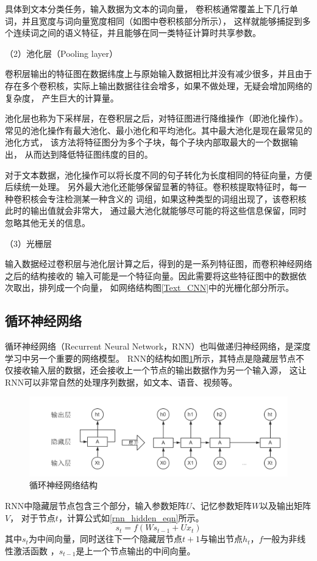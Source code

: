 具体到文本分类任务，输入数据为文本的词向量，
卷积核通常覆盖上下几行单词，并且宽度与词向量宽度相同（如图中卷积核部分所示），
这样就能够捕捉到多个连续词之间的语义特征，并且能够在同一类特征计算时共享参数。

（2）池化层（Pooling layer）

卷积层输出的特征图在数据纬度上与原始输入数据相比并没有减少很多，并且由于
存在多个卷积核，实际上输出数据往往会增多，如果不做处理，无疑会增加网络的复杂度，
产生巨大的计算量。

池化层也称为下采样层，在卷积层之后，对特征图进行降维操作（即池化操作）。
常见的池化操作有最大池化、最小池化和平均池化。其中最大池化是现在最常见的池化方式，
该方法将特征图分为多个子块，每个子块内部取最大的一个数据输出，
从而达到降低特征图纬度的目的。

对于文本数据，池化操作可以将长度不同的句子转化为长度相同的特征向量，方便后续统一处理。
另外最大池化还能够保留显著的特征。卷积核提取特征时，每一种卷积核会专注检测某一种含义的
词组，如果这种类型的词组出现了，该卷积核此时的输出值就会非常大，
通过最大池化就能够尽可能的将这些信息保留，同时忽略其他无关的信息。

（3）光栅层

输入数据经过卷积层与池化层计算之后，得到的是一系列特征图，而卷积神经网络之后的结构接收的
输入可能是一个特征向量。因此需要将这些特征图中的数据依次取出，排列成一个向量，
如网络结构图\ref{Text_CNN}中的光栅化部分所示。


\subsection{循环神经网络}
\label{rnn_section}
循环神经网络（Recurrent Neural Network，RNN）也叫做递归神经网络，是深度学习中另一个重要的网络模型。
RNN的结构如图\ref{RNN}所示，其特点是隐藏层节点不仅接收输入层的数据，还会接收上一个节点的输出数据作为另一个输入源，
这让RNN可以非常自然的处理序列数据，如文本、语音、视频等。
\begin{figure}[h]
    \includegraphics[scale=0.4]{picture/RNN.png}
    \caption{循环神经网络结构}
    \label{RNN}
\end{figure}
RNN中隐藏层节点包含三个部分，输入参数矩阵$U$、记忆参数矩阵$W$以及输出矩阵$V$，
对于节点$t$，计算公式如\ref{rnn_hidden_eqn}所示。
\begin{equation}
    s_t=f\left ( Ws_{t-1}+Ux_t \right )
    \label{rnn_hidden_eqn}
\end{equation}
其中$s_t$为中间向量，同时送往下一个隐藏层节点$t+1$与输出节点$h_t$，$f$一般为非线性激活函数
，$s_{t-1}$是上一个节点输出的中间向量。

